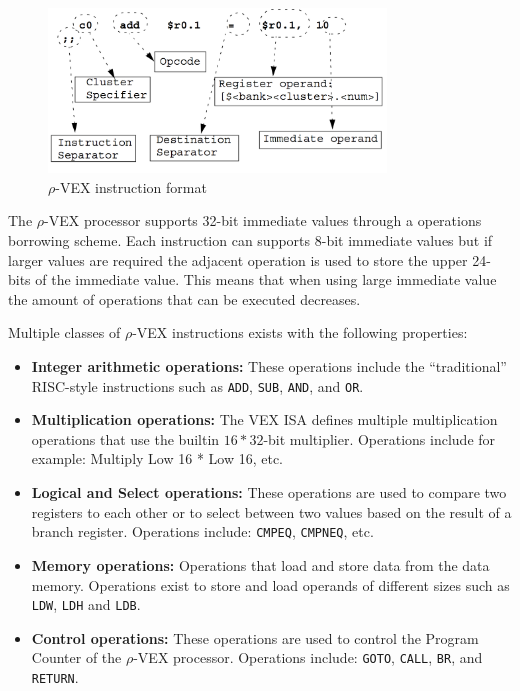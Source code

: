 \begin{figure}[ht!]
\centering
\includegraphics[width=0.8\textwidth]{2_background/img/Instructions.png}
\caption{$\rho$-VEX instruction format}
\label{fig:rvex_asm}
\end{figure}

The $\rho$-VEX processor supports 32-bit immediate values through a operations borrowing scheme. Each instruction can supports 8-bit immediate values but if larger values are required the adjacent operation is used to store the upper 24-bits of the immediate value. This means that when using large immediate value the amount of operations that can be executed decreases.

Multiple classes of $\rho$-VEX instructions exists with the following properties:

\begin{itemize}
  \item \textbf{Integer arithmetic operations:} These operations include the “traditional” RISC-style instructions such as \texttt{ADD}, \texttt{SUB}, \texttt{AND}, and \texttt{OR}. 
  \item \textbf{Multiplication operations:} The VEX ISA defines multiple multiplication operations that use the builtin $16*32$-bit multiplier. Operations include for example: Multiply Low 16 * Low 16, etc. 
  \item \textbf{Logical and Select operations:} These operations are used to compare two registers to each other or to select between two values based on the result of a branch register. Operations include: \texttt{CMPEQ}, \texttt{CMPNEQ}, etc.
  \item \textbf{Memory operations:} Operations that load and store data from the data memory. Operations exist to store and load operands of different sizes such as \texttt{LDW}, \texttt{LDH} and \texttt{LDB}.
  \item \textbf{Control operations:} These operations are used to control the Program Counter of the $\rho$-VEX processor. Operations include: \texttt{GOTO}, \texttt{CALL}, \texttt{BR}, and \texttt{RETURN}.
\end{itemize}


